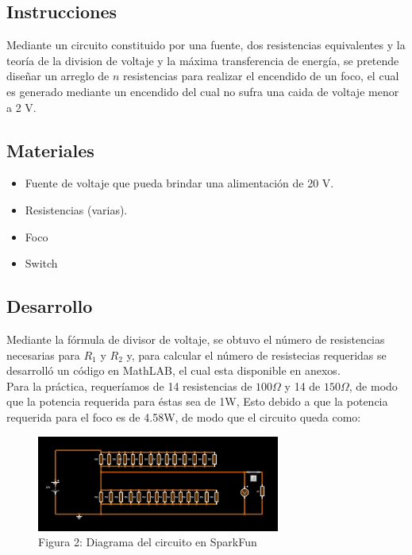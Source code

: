 \subsection{Instrucciones}

Mediante un circuito constituido por una fuente, dos resistencias equivalentes y
la teoría de la division de voltaje y la máxima transferencia de energía, se
pretende diseñar un arreglo de $n$ resistencias para realizar el encendido de
un foco, el cual es generado mediante un encendido del cual no sufra una caida
de voltaje menor a 2 V.

\subsection{Materiales}

\begin{itemize}
    \item Fuente de voltaje que pueda brindar una alimentación de 20 V.
    \item Resistencias (varias).
    \item Foco
    \item Switch
    \end{itemize}


\subsection{Desarrollo}

Mediante la fórmula de divisor de voltaje, se obtuvo el número de resistencias necesarias para $R_1$ y $R_2$ y, para calcular el número de resistecias requeridas se desarrolló un código en MathLAB, el cual esta disponible en anexos.\\

Para la práctica, requeríamos de 14 resistencias de $100 \Omega$  y 14 de $150 \Omega$, de modo que la potencia requerida para éstas sea de 1W,
Esto debido a que la potencia requerida para el foco es de 4.58W, de modo que el circuito queda como:
\clearpage

\begin{figure}
    \centering
    \includegraphics[width=8cm]{media/Circuito1.jpg}
    \caption{Figura 2: Diagrama del circuito en SparkFun}
\end{figure}

